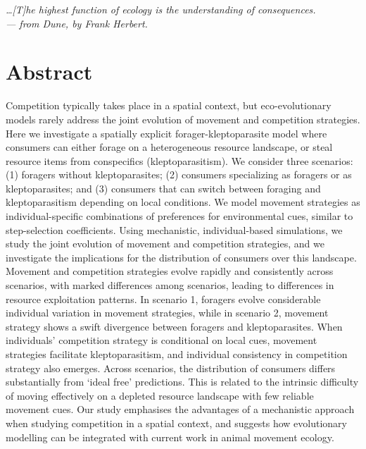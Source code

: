 
\begin{center}
    \emph{\ldots [T]he highest function of ecology is the understanding of consequences.\\
    --- \small{from Dune, by Frank Herbert.}}
\end{center}

\section*{Abstract}

{
    Competition typically takes place in a spatial context, but eco-evolutionary models rarely address the joint evolution of movement and competition strategies.
    Here we investigate a spatially explicit forager-kleptoparasite model where consumers can either forage on a heterogeneous resource landscape, or steal resource items from conspecifics (kleptoparasitism). We consider three scenarios: (1) foragers without kleptoparasites; (2) consumers specializing as foragers or as kleptoparasites; and (3) consumers that can switch between foraging and kleptoparasitism depending on local conditions.
    We model movement strategies as individual-specific combinations of preferences for environmental cues, similar to step-selection coefficients.
    Using mechanistic, individual-based simulations, we study the joint evolution of movement and competition strategies, and we investigate the implications for the distribution of consumers over this landscape.
    Movement and competition strategies evolve rapidly and consistently across scenarios, with marked differences among scenarios, leading to differences in resource exploitation patterns.
    In scenario 1, foragers evolve considerable individual variation in movement strategies, while in scenario 2, movement strategy shows a swift divergence between foragers and kleptoparasites.
    When individuals' competition strategy is conditional on local cues, movement strategies facilitate kleptoparasitism, and individual consistency in competition strategy also emerges.
    Across scenarios, the distribution of consumers differs substantially from `ideal free' predictions.
    This is related to the intrinsic difficulty of moving effectively on a depleted resource landscape with few reliable movement cues.
    Our study emphasises the advantages of a mechanistic approach when studying competition in a spatial context, and suggests how evolutionary modelling can be integrated with current work in animal movement ecology.
}

